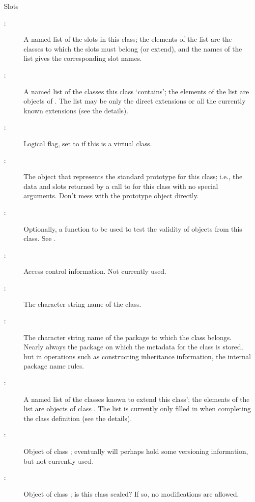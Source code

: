 \begin{Section}{Slots}
\begin{description}

\item[:] A named list of the slots in this class; the
elements of the list are the classes to which the slots must
belong (or extend), and the names of the list gives the
corresponding slot names.
\item[:] A named list of the classes this class
`contains'; the elements of the list are objects of
. The list may be only the
direct extensions or all the currently known extensions (see the
details).
\item[:] Logical flag, set to  if this is
a virtual class.
\item[:] The object that represents the standard
prototype for this class; i.e., the data and slots returned by a
call to  for this class with no special
arguments.  Don't mess with the prototype object directly.
\item[:] Optionally, a function to be used to test
the validity of objects from this class.
See .
\item[:] Access control information.  Not currently used.
\item[:] The character string name of the class.
\item[:] The character string name of the package to
which the class belongs.  Nearly always the package on which the
metadata for the class is stored, but in operations such as
constructing inheritance information, the internal package name
rules.
\item[:] A named list of the classes known to
extend this class'; the elements of the list are objects of class
.  The list is currently only
filled in when completing the class definition (see the details).
\item[:] Object of class ;
eventually will perhaps hold some versioning information, but not
currently used. 
\item[:] Object of class ; is this
class sealed?  If so, no modifications are allowed. 

\end{description}

\end{Section}
